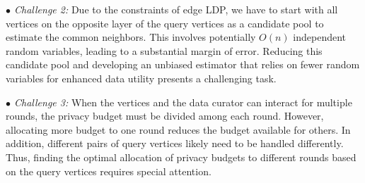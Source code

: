 \noindent 
{\em $\bullet$ Challenge 2:} 
Due to the constraints of edge LDP, we have to start with all vertices on the opposite layer of the query vertices as a candidate pool to estimate the common neighbors. 
This involves potentially $O(n)$ independent random variables, leading to a substantial margin of error. 
Reducing this candidate pool and developing an unbiased estimator that relies on fewer random variables for enhanced data utility presents a challenging task. 

\noindent 
{\em $\bullet$ Challenge 3:} 
When the vertices and the data curator can interact for multiple rounds, the privacy budget must be divided among each round. However, allocating more budget to one round reduces the budget available for others. 
In addition, different pairs of query vertices likely need to be handled differently. 
Thus, finding the optimal allocation of privacy budgets to different rounds based on the query vertices requires special attention. 



